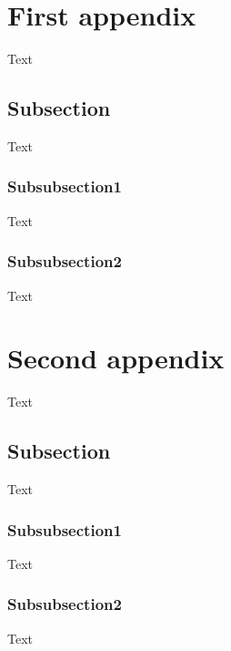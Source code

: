 \section{First appendix}
Text
\subsection{Subsection}
Text
\subsubsection{Subsubsection1}
Text
\subsubsection{Subsubsection2}
Text

\section{Second appendix}
Text
\subsection{Subsection}
Text
\subsubsection{Subsubsection1}
Text
\subsubsection{Subsubsection2}
Text

